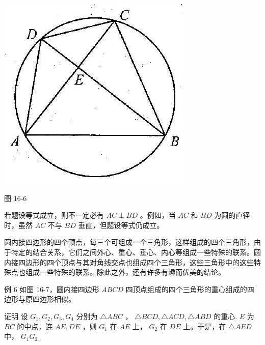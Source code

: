 \documentclass[10pt]{article}
\begin{document}
\begin{center}
\includegraphics[max width=\textwidth]{2024_10_30_2c8f45efd4a519b08e1ag-150}
\end{center}

图 16-6

若题设等式成立，则不一定必有 $A C \perp B D$ 。例如，当 $A C$ 和 $B D$ 为圆的直径时，虽然 $A C$ 不与 $B D$ 垂直，但题设等式仍成立。

圆内接四边形的四个顶点，每三个可组成一个三角形，这样组成的四个三角形，由于特定的结合关系，它们之间外心、重心、垂心、内心等组成一些特殊的联系。圆内接四边形的四个顶点与其对角线交点也组成四个三角形，这些三角形中的这些特殊点也组成一些特殊的联系。除此之外，还有许多有趣而优美的结论。

例 6 如图 16-7，圆内接四边形 $A B C D$ 四顶点组成的四个三角形的重心组成的四边形与原四边形相似。

证明 设 $G_{1}, G_{2}, G_{3}, G_{4}$ 分别为 $\triangle A B C$ ， $\triangle B C D, \triangle A C D, \triangle A B D$ 的重心. $E$ 为 $B C$ 的中点，连 $A E, D E$ ，则 $G_{1}$ 在 $A E$ 上， $G_{2}$ 在 $D E$ 上。于是，在 $\triangle A E D$ 中， $G_{1} G_{2} \underline{ }$
\end{document}
